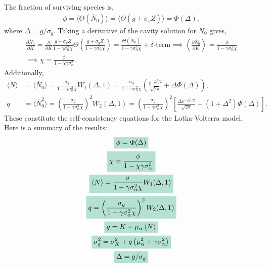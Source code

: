 \documentclass[10pt]{article}
\newcommand{\mathcolorbox}[1]{\colorbox{hlcol}{$\displaystyle #1$}}
\newcommand{\eval}[1]{\left\langle #1 \right\rangle}
\begin{document}
The fraction of surviving species is,
\begin{align}
	\phi = \langle  \Theta(\overline{N}_0)\rangle
	=
	\langle \Theta(g + \sigma_g Z)\rangle
	=
	\Phi(\Delta),
\end{align}
where $\Delta = g/\sigma_g$.
Taking a derivative of the cavity solution for $\overline N_0 $ gives,
\begin{gather}
	\frac{\partial \overline N_0}{\partial K}
	=
	\frac{\partial}{\partial K}
	\frac{g + \sigma_g Z}{1-\gamma \sigma_\alpha^2 \chi}
	\Theta\left(\frac{g + \sigma_g Z}{1-\gamma \sigma_\alpha^2 \chi}\right)
	=
	\frac{\Theta(\overline{N}_0)}{1-\gamma \sigma_\alpha^2 \chi}
	+
	\text{$\delta$-term}
	\implies
	\left\langle \frac{\partial \overline N_0}{\partial K} \right\rangle
	=
	\frac{\phi}{1-\gamma \sigma_\alpha^2 \chi}
	\nonumber
	\\
	\implies
	\chi = \frac{\phi}{1-\chi \gamma \sigma_\alpha^2}.
	\label{LVchiselfconsist}
\end{gather}
Additionally,
\begin{align}
	\langle N\rangle
	&=
	\langle\overline N_0\rangle
	=
	\frac{\sigma_g}{1-\gamma\sigma_\alpha^2 \chi}
	W_1(\Delta,1)
	=
	\frac{\sigma_g}{1-\gamma\sigma_\alpha^2 \chi}
	\left(
		\frac{e^{-\Delta^2/2}}{\sqrt{2\pi}}
		+
		\Delta\Phi(\Delta)
	\right),
	\\
	q &= 
	\langle \overline N_0^2\rangle
	=
	\left(
		\frac{\sigma_g}{1-\gamma\sigma_\alpha^2 \chi}
	\right)^2
	W_2\left(
		\Delta,1
	\right)
	=
	\left(
		\frac{\sigma_g}{1-\gamma\sigma_\alpha^2 \chi}
	\right)^2
	\left[
		\frac{\Delta e^{-\Delta^2/2}}{\sqrt{2\pi}}
		+
		(1+\Delta^2)\Phi(\Delta)
	\right].
\end{align}
These constitute the self-consistency equations for the Lotka-Volterra model.
Here is a summary of the results:
\begin{gather}
	\mathcolorbox{
		\phi
		=
		\Phi(\Delta)
	}
	\\
	\mathcolorbox{
		\chi = \frac{\phi}{1-\chi \gamma\sigma_\alpha^2}
	}
	\\
	\mathcolorbox{
		\eval{N}
		=
		\frac{\sigma}{1-\gamma\sigma_\alpha^2 \chi}
		W_1(\Delta,1)
	}
	\\
	\mathcolorbox{
		q
		=
		\left(\frac{\sigma_g}{1-\gamma\sigma_\alpha^2\chi}\right)^2
		W_2(\Delta,1)
	}
	\\
	\mathcolorbox{
		g=K-\mu_\alpha \eval{N}
	}
	\\
	\mathcolorbox{
		\sigma_g^2 = \sigma_K^2 + q\left(
			\mu_\alpha^2 + \gamma \sigma_\alpha^2
		\right)
	}
	\\
	\mathcolorbox{
		\Delta = g/\sigma_g
	}
\end{gather}
\end{document}
